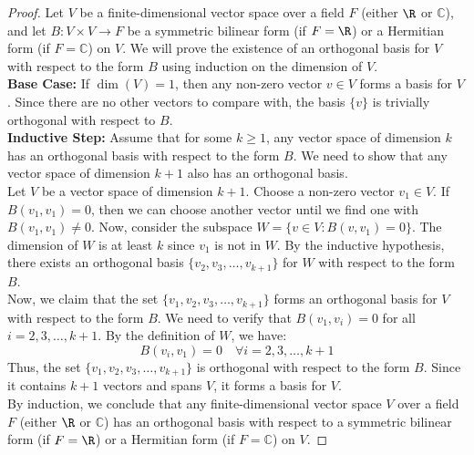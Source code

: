 \documentclass[openany]{book}
\renewcommand{\C}{\mathbb{C}}
\begin{document}
\begin{proof}
Let $V$ be a finite-dimensional vector space over a field $F$ (either $\R$ or $\C$), and let $B: V \times V \to F$ be a symmetric bilinear form (if $F = \R$) or a Hermitian form (if $F = \C$) on $V$. We will prove the existence of an orthogonal basis for $V$ with respect to the form $B$ using induction on the dimension of $V$. \\
\textbf{Base Case:} If $\dim(V) = 1$, then any non-zero vector $v \in V$ forms a basis for $V$. Since there are no other vectors to compare with, the basis $\{v\}$ is trivially orthogonal with respect to $B$. \\
\textbf{Inductive Step:} Assume that for some $k \geq 1$, any vector space of dimension $k$ has an orthogonal basis with respect to the form $B$. We need to show that any vector space of dimension $k + 1$ also has an orthogonal basis. \\
Let $V$ be a vector space of dimension $k + 1$. Choose a non-zero vector $v_1 \in V$. If $B(v_1, v_1) = 0$, then we can choose another vector until we find one with $B(v_1, v_1) \neq 0$. Now, consider the subspace $W = \{v \in V : B(v, v_1) = 0\}$. The dimension of $W$ is at least $k$ since $v_1$ is not in $W$. By the inductive hypothesis, there exists an orthogonal basis $\{v_2, v_3, \ldots, v_{k+1}\}$ for $W$ with respect to the form $B$. \\
Now, we claim that the set $\{v_1, v_2, v_3, \ldots, v_{k+1}\}$ forms an orthogonal basis for $V$ with respect to the form $B$. We need to verify that $B(v_1, v_i) = 0$ for all $i = 2, 3, \ldots, k + 1$. By the definition of $W$, we have:
$$B(v_i, v_1) = 0 \quad \forall i = 2, 3, \ldots, k + 1$$
Thus, the set $\{v_1, v_2, v_3, \ldots, v_{k+1}\}$ is orthogonal with respect to the form $B$. Since it contains $k + 1$ vectors and spans $V$, it forms a basis for $V$. \\
By induction, we conclude that any finite-dimensional vector space $V$ over a field $F$ (either $\R$ or $\C$) has an orthogonal basis with respect to a symmetric bilinear form (if $F = \R$) or a Hermitian form (if $F = \C$) on $V$.
\end{proof}
\end{document}

